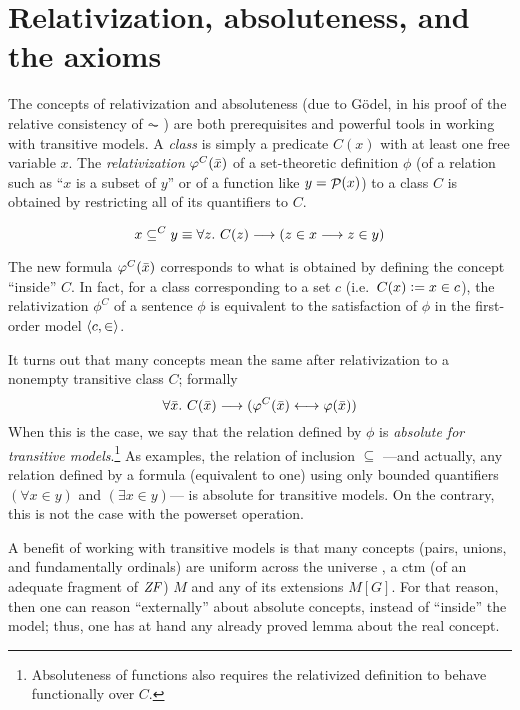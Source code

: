 \section{Relativization,  absoluteness, and the axioms}
\label{sec:relat-absol}

The concepts of relativization and absoluteness (due to Gödel, in his
proof of the relative consistency of $\AC$ \cite{godel-L}) 
are both
prerequisites and powerful tools in working with transitive
models. A \emph{class} is simply a predicate $C(x)$ with at least one
free variable $x$.
The \emph{relativization} $\phi^C(\bx)$ of a set-theoretic
definition
$\phi$ (of a relation such
as ``$x$ is a subset of $y$'' or of a function like $y=\P(x)$) to
a class $C$ is obtained by restricting all of its quantifiers to $C$.

\[
x \sbq^C y \equiv \forall z.\ C(z) \longrightarrow (z\in x
\longrightarrow z\in y)
\]

The new formula $\phi^C(\bx)$ corresponds to what is obtained by defining
the concept ``inside'' $C$. In fact, for a class corresponding to a
set $c$ (i.e.\ $C(x) \defi x \in c$), the relativization $\phi^C$ of a 
sentence $\phi$ is equivalent to the satisfaction of $\phi$ in the
first-order model $\lb c, \in\rb$.

It turns out that many concepts mean the
same after relativization to a nonempty transitive class $C$; formally
\[
\forall\bx.\ C(\bx) \longrightarrow (\phi^C(\bx) \longleftrightarrow
\phi(\bx))
\]
When this is the case, we say that the relation defined by $\phi$ is
\emph{absolute for transitive models}.\footnote{Absoluteness of
  functions also requires the relativized definition to behave
  functionally over $C$.} As examples, the relation of inclusion
$\subseteq$ ---and actually, any relation defined by a formula
(equivalent to one) using only bounded quantifiers $(\forall x\in y)$
and $(\exists x\in y)$--- is absolute for transitive models. On the
contrary, this is not the case with the powerset operation.

A benefit of working with transitive models
is that many concepts (pairs, unions, and fundamentally ordinals) are
uniform across the universe , a ctm (of an adequate fragment
of $\ZF$) $M$ and any of its extensions $M[G]$.
For that reason, then one can reason
``externally'' about absolute concepts, instead
of ``inside'' the model; thus, one has at hand any already proved
lemma about the real concept.

